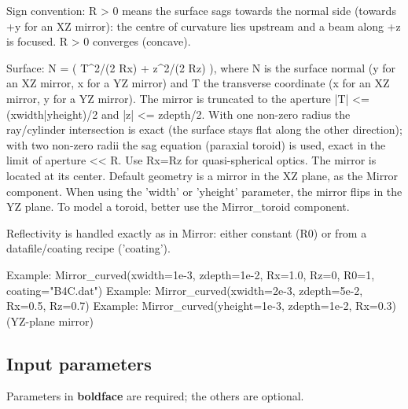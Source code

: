 Sign convention: R \textgreater{} 0 means the surface sags towards the normal side (towards +y for an XZ mirror): the centre of curvature lies upstream and a beam along +z is focused. R \textgreater{} 0 converges (concave).

Surface: N = ( T\textasciicircum{}2/(2 Rx) + z\textasciicircum{}2/(2 Rz) ), where N is the surface normal (y for an XZ mirror, x for a YZ mirror) and T the transverse coordinate (x for an XZ mirror, y for a YZ mirror). The mirror is truncated to the aperture |T| \textless{}= (xwidth|yheight)/2 and |z| \textless{}= zdepth/2. With one non-zero radius the ray/cylinder intersection is exact (the surface stays flat along the other direction); with two non-zero radii the sag equation (paraxial toroid) is used, exact in the limit of aperture \textless{}\textless{} R. Use Rx=Rz for quasi-spherical optics. The mirror is located at its center. Default geometry is a mirror in the XZ plane, as the Mirror component. When using the 'width' or 'yheight' parameter, the mirror flips in the YZ plane. To model a toroid, better use the Mirror\_toroid component.

Reflectivity is handled exactly as in Mirror: either constant (R0) or from a datafile/coating recipe ('coating').

Example: Mirror\_curved(xwidth=1e-3, zdepth=1e-2, Rx=1.0, Rz=0, R0=1, coating="B4C.dat") Example: Mirror\_curved(xwidth=2e-3, zdepth=5e-2, Rx=0.5, Rz=0.7) Example: Mirror\_curved(yheight=1e-3, zdepth=1e-2, Rx=0.3) (YZ-plane mirror)

\subsection*{Input parameters}
Parameters in \textbf{boldface} are required; the others are optional.

